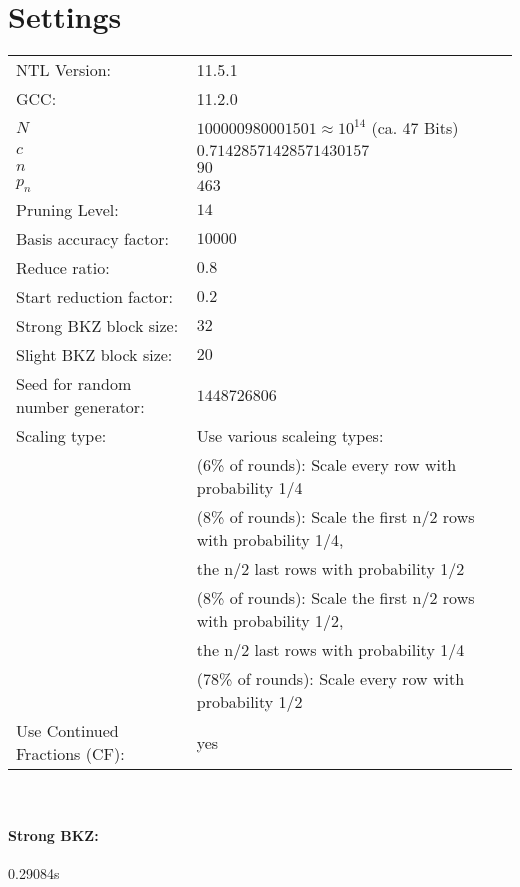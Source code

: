 \documentclass[a4paper,twoside,10pt]{report}
\begin{document}
\onehalfspacing

\section*{Settings}
\begin{tabular}{ll}
NTL Version: & 11.5.1\\GCC: &11.2.0\\
$N$ & $100000980001501\approx 10^{14}$ (ca. 47 Bits)\\$c$ & $0.71428571428571430157$\\
$n$ & $ 90$\\
$p_n$ & $ 463$\\
Pruning Level: & $14$\\
Basis accuracy factor: & $10000$\\
Reduce ratio: & $0.8$\\
Start reduction factor: & $0.2$\\
Strong BKZ block size: & $32$\\
Slight BKZ block size: & $20$\\
Seed for random number generator: & $1448726806$\\
Scaling type: & Use various scaleing types:\\& (\phantom{7}6\% of rounds): Scale every row with probability 1/4\\& (\phantom{7}8\% of rounds): Scale the first n/2 rows with probability 1/4,\\& \phantom{(76\% of rounds): } the n/2 last rows with probability 1/2\\& (\phantom{7}8\% of rounds): Scale the first n/2 rows with probability 1/2,\\& \phantom{(76\% of rounds): } the n/2 last rows with probability 1/4\\& (78\% of rounds): Scale every row with probability 1/2\\
Use Continued Fractions (CF): & yes\\
\end{tabular}\\
\paragraph{Strong BKZ:}0.29084s
\end{document}
